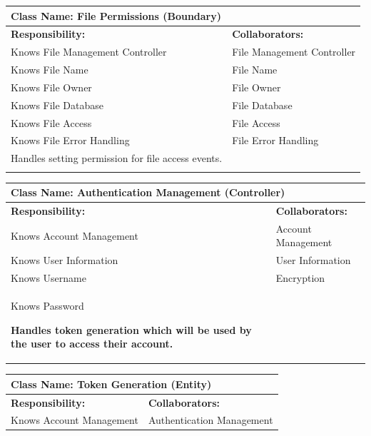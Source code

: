 \documentclass[]{article}
\begin{document}
\begin{itemize}
    	\begin{table}[ht]
		\centering
		\begin{tabular}{|p{7cm}|p{7cm}|}
		\hline 
		\multicolumn{2}{|l|}{\textbf{Class Name:} File Permissions (Boundary)} \\
		\hline
		\textbf{Responsibility:} & \textbf{Collaborators:} \\
		\hline
  			Knows File Management Controller & File Management Controller \\
			Knows File Name & File Name \\
			Knows File Owner & File Owner \\
			Knows File Database & File Database \\
			Knows File Access & File Access \\
			Knows File Error Handling & File Error Handling \\
			Handles setting permission for file access events. &\\
		\vspace{1in} & \\
		\hline
		\end{tabular}
	\end{table}

     	\begin{table}[ht]
		\centering
		\begin{tabular}{|p{7cm}|p{7cm}|}
		\hline 
		\multicolumn{2}{|l|}{\textbf{Class Name: Authentication Management (Controller)
		}} \\
		\hline
		\textbf{Responsibility:} & \textbf{Collaborators:} \\
		\hline
            Knows Account Management & Account Management\\
            
            Knows User Information & User Information\\
            Knows Username & Encryption\\
            Knows Password\
            
            \vspace{0.1in}
            \textbf{Handles token generation which will be used by the user to access their account.}

		\vspace{1in} & \\
		\hline
  
		\end{tabular}
	\end{table}
 

	\begin{table}[ht]
		\centering
		\begin{tabular}{|p{7cm}|p{7cm}|}
		\hline 
		 \multicolumn{2}{|l|}{\textbf{Class Name: Token Generation (Entity)
}} \\
		\hline
		\textbf{Responsibility:} & \textbf{Collaborators:} \\
		\hline
            Knows Account Management & Authentication Management\\
            

\end{tabular}
\end{table}
\end{itemize}
\end{document}
